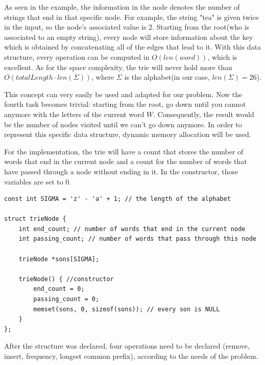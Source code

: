 \documentclass[letterpaper]{article}
\begin{document}
As seen in the example, the information in the node denotes the number of strings that end in that specific node. For example, the string "tea" is given twice in the input, so the node's associated value is 2. Starting from the root(who is associated to an empty string), every node will store information about the key which is obtained by concatenating all of the edges that lead to it. With this data structure, every operation can be computed in $O(len(word))$, which is excellent. As for the space complexity, the trie will never hold more than $O(totalLength \cdot len(\Sigma))$, where $\Sigma$ is the alphabet(in our case, $len(\Sigma) = 26$).

This concept can very easily be used and adapted for our problem. Now the fourth task becomes trivial: starting from the root, go down until you cannot anymore with the letters of the current word $W$. Consequently, the result would be the number of nodes visited until we can't go down anymore. In order to represent this specific data structure, dynamic memory allocation will be used.

For the implementation, the trie will have a count that stores the number of words that end in the current node and a count for the number of words that have passed through a node without ending in it. In the constructor, those variables are set to 0.

\begin{lstlisting}
const int SIGMA = 'z' - 'a' + 1; // the length of the alphabet

struct trieNode {
    int end_count; // number of words that end in the current node
    int passing_count; // number of words that pass through this node
    
    trieNode *sons[SIGMA];

    trieNode() { //constructor
        end_count = 0;
        passing_count = 0;
        memset(sons, 0, sizeof(sons)); // every son is NULL
    }
};
\end{lstlisting}

After the structure was declared, four operations need to be declared (remove, insert, frequency, longest common prefix), according to the needs of the problem.
\end{document}

